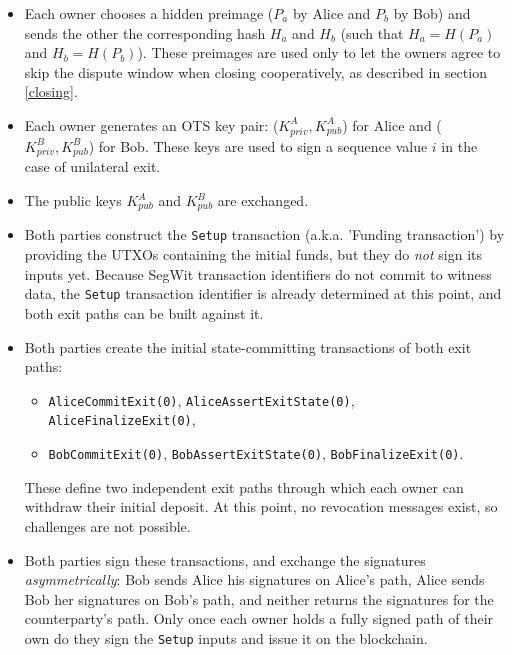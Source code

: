 \documentclass[11pt,a4paper]{article}
\newcommand{\txname}[1]{\texttt{#1}}
\begin{document}
\begin{itemize}
    \item Each owner chooses a hidden preimage ($P_a$ by Alice and $P_b$ by Bob) and sends the other the corresponding hash $H_a$ and $H_b$ (such that $H_a = H(P_a)$ and $H_b = H(P_b)$). These preimages are used only to let the owners agree to skip the dispute window when closing cooperatively, as described in section \ref{closing}.

    \item Each owner generates an OTS key pair: ($K^A_{priv},K^A_{pub}$) for Alice and ($K^B_{priv},K^B_{pub}$) for Bob. These keys are used to sign a sequence value $i$ in the case of unilateral exit. 
    
    \item The public keys $K^A_{pub}$  and $K^B_{pub}$ are exchanged.
 
    \item Both parties construct the \txname{Setup} transaction (a.k.a. 'Funding transaction') by providing the UTXOs containing the initial funds, but they do \emph{not} sign its inputs yet. Because SegWit transaction identifiers do not commit to witness data, the \txname{Setup} transaction identifier is already determined at this point, and both exit paths can be built against it.

    \item Both parties create the initial state-committing transactions of both exit paths:
    \begin{itemize}
        \item \txname{AliceCommitExit(0)}, \txname{AliceAssertExitState(0)}, \txname{AliceFinalizeExit(0)},
        \item \txname{BobCommitExit(0)}, \txname{BobAssertExitState(0)}, \txname{BobFinalizeExit(0)}.
    \end{itemize}
    
    These define two independent exit paths through which each owner can withdraw their initial deposit. At this point, no revocation messages exist, so challenges are not possible.

    \item Both parties sign these transactions, and exchange the signatures \emph{asymmetrically}: Bob sends Alice his signatures on Alice's path, Alice sends Bob her signatures on Bob's path, and neither returns the signatures for the counterparty's path. Only once each owner holds a fully signed path of their own do they sign the \txname{Setup} inputs and issue it on the blockchain.
\end{itemize}
\end{document}

